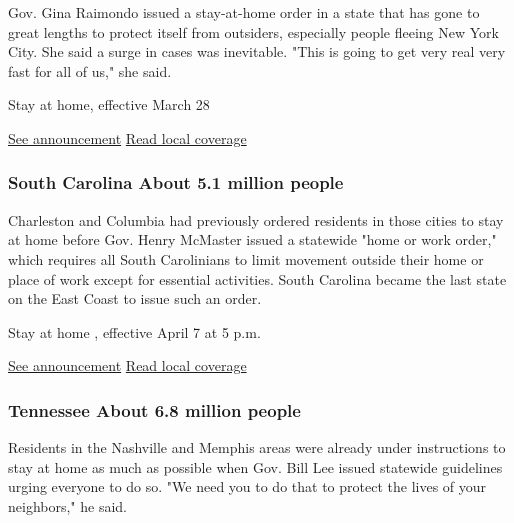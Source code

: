 Gov. Gina Raimondo issued a stay-at-home order in a state that has gone
to great lengths to protect itself from outsiders, especially people
fleeing New York City. She said a surge in cases was inevitable. "This
is going to get very real very fast for all of us," she said.

Stay at home, effective March 28

\href{http://governor.ri.gov/documents/orders/Executive-Order-20-13.pdf}{See
announcement} \textbar{}
\href{https://www.providencejournal.com/news/20200328/ri-tightens-restrictions-after-2-virus-deaths}{Read
local coverage}

\hypertarget{south-carolina-about-51-million-people}{%
\subsubsection{South Carolina About 5.1 million
people}\label{south-carolina-about-51-million-people}}

Charleston and Columbia had previously ordered residents in those cities
to stay at home before Gov. Henry McMaster issued a statewide "home or
work order," which requires all South Carolinians to limit movement
outside their home or place of work except for essential activities.
South Carolina became the last state on the East Coast to issue such an
order.

Stay at home , effective April 7 at 5 p.m.

\href{https://governor.sc.gov/sites/default/files/Documents/Executive-Orders/2020-04-06\%20eFILED\%20Executive\%20Order\%20No.\%202020-21\%20-\%20Stay\%20at\%20Home\%20or\%20Work\%20Order.pdf}{See
announcement} \textbar{}
\href{https://www.postandcourier.com/health/covid19/sc-issues-coronavirus-stay-at-home-order-limits-number-of-shoppers-in-stores/article_144481a6-7834-11ea-b747-9324c93bd43b.html}{Read
local coverage}

\hypertarget{tennessee-about-68-million-people}{%
\subsubsection{Tennessee About 6.8 million
people}\label{tennessee-about-68-million-people}}

Residents in the Nashville and Memphis areas were already under
instructions to stay at home as much as possible when Gov. Bill Lee
issued statewide guidelines urging everyone to do so. "We need you to do
that to protect the lives of your neighbors," he said.

